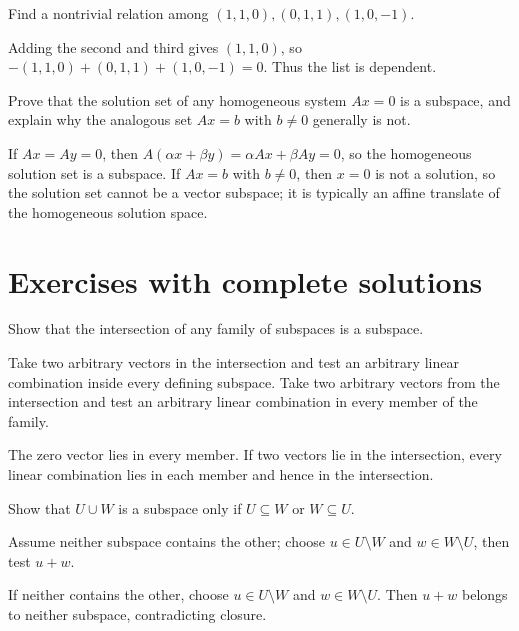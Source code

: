 \begin{problem}\label{prob:i02-problem-11}
Find a nontrivial relation among $(1,1,0),(0,1,1),(1,0,-1)$.
\end{problem}
\begin{solution}
Adding the second and third gives $(1,1,0)$, so $-(1,1,0)+(0,1,1)+(1,0,-1)=0$. Thus the list is dependent.
\end{solution}

\begin{problem}\label{prob:i02-problem-12}
Prove that the solution set of any homogeneous system $Ax=0$ is a subspace, and explain why the analogous set $Ax=b$ with $b\ne0$ generally is not.
\end{problem}
\begin{solution}
If $Ax=Ay=0$, then $A(\alpha x+\beta y)=\alpha Ax+\beta Ay=0$, so the homogeneous solution set is a subspace. If $Ax=b$ with $b\ne0$, then $x=0$ is not a solution, so the solution set cannot be a vector subspace; it is typically an affine translate of the homogeneous solution space.
\end{solution}


\section{Exercises with complete solutions}

\begin{exercise}\label{exr:i02-01}
Show that the intersection of any family of subspaces is a subspace.
\end{exercise}
\begin{hint}
Take two arbitrary vectors in the intersection and test an arbitrary linear combination inside every defining subspace. Take two arbitrary vectors from the intersection and test an arbitrary linear combination in every member of the family.
\end{hint}
\begin{solution}
The zero vector lies in every member. If two vectors lie in the intersection, every linear combination lies in each member and hence in the intersection.
\end{solution}

\begin{exercise}\label{exr:i02-02}
Show that $U\cup W$ is a subspace only if $U\subseteq W$ or $W\subseteq U$.
\end{exercise}
\begin{hint}
Assume neither subspace contains the other; choose \(u\in U\setminus W\) and \(w\in W\setminus U\), then test \(u+w\).
\end{hint}
\begin{solution}
If neither contains the other, choose $u\in U\setminus W$ and $w\in W\setminus U$. Then $u+w$ belongs to neither subspace, contradicting closure.
\end{solution}

